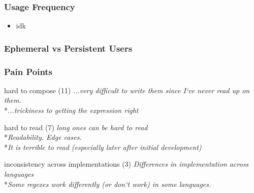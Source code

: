 
\begin{frame}
\frametitle{Usage Frequency}
\begin{itemize}
\item idk
\end{itemize}
\end{frame}



\begin{frame}
\frametitle{Ephemeral vs Persistent Users}
\end{frame}


\begin{frame}
\frametitle{Pain Points}
\begin{block}{hard to compose (11)}
\emph{...very difficult to write them since I`ve never read up on them.}
\\*\emph{...trickiness to getting the expression right}
\end{block}
\begin{block}{hard to read (7)}
\emph{long ones can be hard to read}
\\*\emph{Readability. Edge cases.}
\\*\emph{It is terrible to read (especially later after initial development) }
\end{block}
\begin{block}{inconsistency across implementations (3)}
\emph{Differences in implementation across languages}
\\*\emph{Some regexes work differently (or don`t work) in some languages.}
\end{block}
\end{frame}












